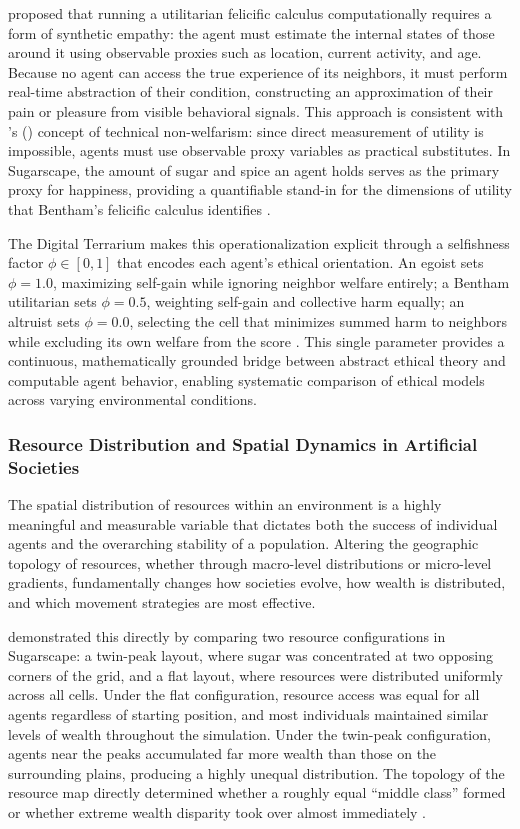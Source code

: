 \documentclass{icsthesis}
\begin{document}
\begin{mainmatter}
\citet{Majot2014} proposed that running a utilitarian felicific calculus computationally requires a form of synthetic empathy: the agent must estimate the internal states of those around it using observable proxies such as location, current activity, and age. Because no agent can access the true experience of its neighbors, it must perform real-time abstraction of their condition, constructing an approximation of their pain or pleasure from visible behavioral signals. This approach is consistent with \citeauthor{Baujard2009}'s (\citeyear{Baujard2009}) concept of technical non-welfarism: since direct measurement of utility is impossible, agents must use observable proxy variables as practical substitutes. In Sugarscape, the amount of sugar and spice an agent holds serves as the primary proxy for happiness, providing a quantifiable stand-in for the dimensions of utility that Bentham's felicific calculus identifies \citep{KremerHerman2024}.

The Digital Terrarium makes this operationalization explicit through a selfishness factor $\phi \in [0, 1]$ that encodes each agent's ethical orientation. An egoist sets $\phi = 1.0$, maximizing self-gain while ignoring neighbor welfare entirely; a Bentham utilitarian sets $\phi = 0.5$, weighting self-gain and collective harm equally; an altruist sets $\phi = 0.0$, selecting the cell that minimizes summed harm to neighbors while excluding its own welfare from the score \citep{KremerHerman2024}. This single parameter provides a continuous, mathematically grounded bridge between abstract ethical theory and computable agent behavior, enabling systematic comparison of ethical models across varying environmental conditions.

\subsubsection{Resource Distribution and Spatial Dynamics in Artificial Societies}
The spatial distribution of resources within an environment is a highly meaningful and measurable variable that dictates both the success of individual agents and the overarching stability of a population. Altering the geographic topology of resources, whether through macro-level distributions or micro-level gradients, fundamentally changes how societies evolve, how wealth is distributed, and which movement strategies are most effective.

\citet{Hawick2014} demonstrated this directly by comparing two resource configurations in Sugarscape: a twin-peak layout, where sugar was concentrated at two opposing corners of the grid, and a flat layout, where resources were distributed uniformly across all cells. Under the flat configuration, resource access was equal for all agents regardless of starting position, and most individuals maintained similar levels of wealth throughout the simulation. Under the twin-peak configuration, agents near the peaks accumulated far more wealth than those on the surrounding plains, producing a highly unequal distribution. The topology of the resource map directly determined whether a roughly equal ``middle class'' formed or whether extreme wealth disparity took over almost immediately \citep{Hawick2014}.


\end{mainmatter}
\end{document}
